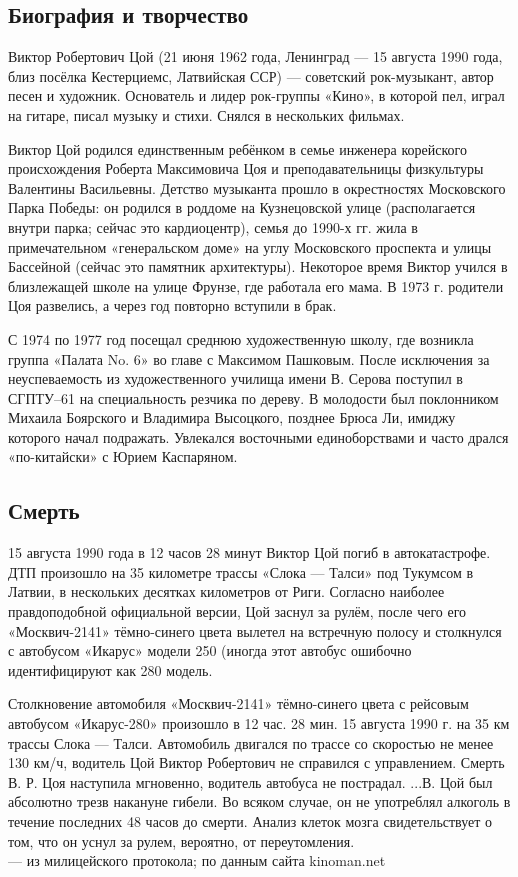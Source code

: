 \subsection{Биография и творчество}
Виктор Робертович Цой (21 июня 1962 года, Ленинград --- 15 августа 1990 года, близ посёлка Кестерциемс, Латвийская ССР) --- советский рок-музыкант, автор песен и художник. Основатель и лидер рок-группы «Кино», в которой пел, играл на гитаре, писал музыку и стихи. Снялся в нескольких фильмах.

Виктор Цой родился единственным ребёнком в семье инженера корейского происхождения Роберта Максимовича Цоя и преподавательницы физкультуры Валентины Васильевны. Детство музыканта прошло в окрестностях Московского Парка Победы: он родился в роддоме на Кузнецовской улице (располагается внутри парка; сейчас это кардиоцентр), семья до 1990-х гг. жила в примечательном «генеральском доме» на углу Московского проспекта и улицы Бассейной (сейчас это памятник архитектуры). Некоторое время Виктор учился в близлежащей школе на улице Фрунзе, где работала его мама. В 1973 г. родители Цоя развелись, а через год повторно вступили в брак.

С 1974 по 1977 год посещал среднюю художественную школу, где возникла группа «Палата No. 6» во главе с Максимом Пашковым.
После исключения за неуспеваемость из художественного училища имени В. Серова поступил в СГПТУ--61 на специальность резчика по дереву.
В молодости был поклонником Михаила Боярского и Владимира Высоцкого, позднее Брюса Ли, имиджу которого начал подражать.
Увлекался восточными единоборствами и часто дрался «по-китайски» с Юрием Каспаряном.

\subsection{Смерть}
15 августа 1990 года в 12 часов 28 минут Виктор Цой погиб в автокатастрофе. ДТП произошло на 35 километре трассы «Слока --- Талси» под Тукумсом в Латвии, в нескольких десятках километров от Риги. Согласно наиболее правдоподобной официальной версии, Цой заснул за рулём, после чего его «Москвич-2141» тёмно-синего цвета вылетел на встречную полосу и столкнулся с автобусом «Икарус» модели 250 (иногда этот автобус ошибочно идентифицируют как 280 модель.

\begin{fancyquotes}
    Столкновение автомобиля «Москвич-2141» тёмно-синего цвета с рейсовым автобусом «Икарус-280» произошло в 12 час. 28 мин. 15 августа 1990 г. на 35 км трассы Слока --- Талси. Автомобиль двигался по трассе со скоростью не менее 130 км/ч, водитель Цой Виктор Робертович не справился с управлением. Смерть В. Р. Цоя наступила мгновенно, водитель автобуса не пострадал. ...В. Цой был абсолютно трезв накануне гибели. Во всяком случае, он не употреблял алкоголь в течение последних 48 часов до смерти. Анализ клеток мозга свидетельствует о том, что он уснул за рулем, вероятно, от переутомления.\\

    --- из милицейского протокола; по данным сайта kinoman.net
\end{fancyquotes}




